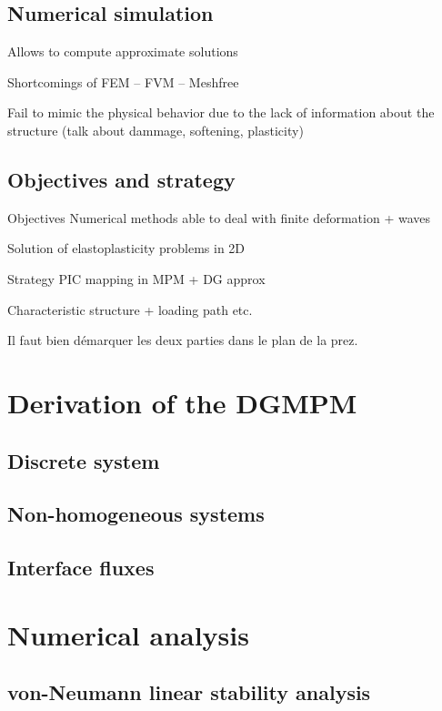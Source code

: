 \documentclass[11pt,aspectratio=169]{beamer}
\begin{document}
\subsection{Numerical simulation}
\begin{frame}
  Allows to compute approximate solutions

  Shortcomings of FEM -- FVM -- Meshfree

  Fail to mimic the physical behavior due to the lack of information about the structure (talk about dammage, softening, plasticity)
\end{frame}

\subsection{Objectives and strategy}
\begin{frame}{Objectives}
  Numerical methods able to deal with finite deformation + waves

  Solution of elastoplasticity problems in 2D
\end{frame}

\begin{frame}{Strategy}
  PIC mapping in MPM + DG approx

  Characteristic structure + loading path etc.

  Il faut bien démarquer les deux parties dans le plan de la prez.
\end{frame}

\section{Derivation of the DGMPM}
\subsection{Discrete system}
\subsection{Non-homogeneous systems}
\subsection{Interface fluxes}

\section{Numerical analysis}
\subsection{von-Neumann linear stability analysis}
\end{document}
